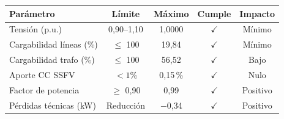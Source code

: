 \begin{tabular}{lcccc}
\toprule
\textbf{Parámetro} & \textbf{Límite} & \textbf{Máximo} & \textbf{Cumple} & \textbf{Impacto} \\
\midrule
Tensión (p.u.) & 0,90--1,10 & 1,0000 & $\checkmark$ & Mínimo \\
Cargabilidad líneas (\%) & $\leq$ 100 & 19,84 & $\checkmark$ & Mínimo \\
Cargabilidad trafo (\%) & $\leq$ 100 & 56,52 & $\checkmark$ & Bajo \\
Aporte CC SSFV & $< 1$\% & 0,15\,\% & $\checkmark$ & Nulo \\
Factor de potencia & $\geq$ 0,90 & 0,99 & $\checkmark$ & Positivo \\
Pérdidas técnicas (kW) & Reducción & $-$0,34 & $\checkmark$ & Positivo \\
\bottomrule
\end{tabular}
